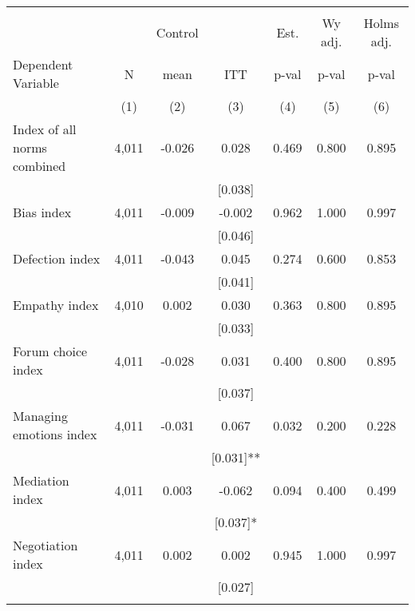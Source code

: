 \begin{tabular}{lcccccc}
\hline \noalign{\smallskip} &  &  &  &  &  & \\
 &  & Control &  & Est. & Wy adj. & Holms adj.\\
Dependent Variable & N & mean & ITT & p-val & p-val & p-val\\
 & (1) & (2) & (3) & (4) & (5) & (6)\\
\noalign{\smallskip}\hline \noalign{\smallskip}Index of all norms combined & 4,011 & -0.026 & 0.028 & 0.469 & 0.800 & 0.895\\
 &  &  & [0.038] &  &  & \\
\quad Bias index & 4,011 & -0.009 & -0.002 & 0.962 & 1.000 & 0.997\\
 &  &  & [0.046] &  &  & \\
\quad Defection index & 4,011 & -0.043 & 0.045 & 0.274 & 0.600 & 0.853\\
 &  &  & [0.041] &  &  & \\
\quad Empathy index & 4,010 & 0.002 & 0.030 & 0.363 & 0.800 & 0.895\\
 &  &  & [0.033] &  &  & \\
\quad Forum choice index & 4,011 & -0.028 & 0.031 & 0.400 & 0.800 & 0.895\\
 &  &  & [0.037] &  &  & \\
\quad Managing emotions index & 4,011 & -0.031 & 0.067 & 0.032 & 0.200 & 0.228\\
 &  &  & [0.031]** &  &  & \\
\quad Mediation index & 4,011 & 0.003 & -0.062 & 0.094 & 0.400 & 0.499\\
 &  &  & [0.037]* &  &  & \\
\quad Negotiation index & 4,011 & 0.002 & 0.002 & 0.945 & 1.000 & 0.997\\
 &  &  & [0.027] &  &  & \\
\noalign{\smallskip}\hline\end{tabular}
